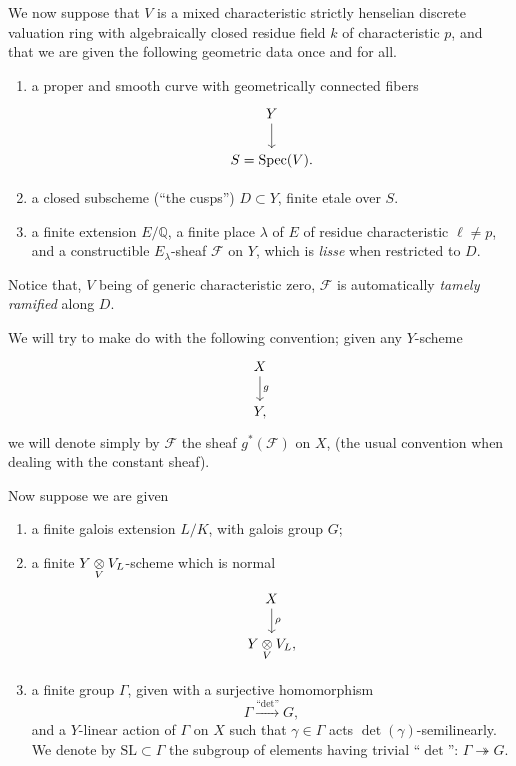 \kmitem\label{item:14.2.1}
We now suppose that $V$ is a mixed characteristic strictly henselian discrete valuation ring with algebraically closed residue field $k$ of characteristic $p$, and that we are given the following geometric data once and for all.
\begin{enumerate}[label=\arabic*)]
\item a proper and smooth curve with geometrically connected fibers
\[
\begin{tikzcd}[row sep=1.8em]
Y \arrow[d] \\
S = \Spec(V) .
\end{tikzcd}
\]
\item a closed subscheme (``the cusps'') $D \subset Y$, finite etale over $S$.
\item a finite extension $E/\mathbb{Q}$, a finite place $\lambda$ of $E$ of residue characteristic $\ell \neq p$, and a constructible $E_\lambda$-sheaf $\mathcal{F}$ on $Y$, which is \emph{lisse} when restricted to $D$.
\end{enumerate}
Notice that, $V$ being of generic characteristic zero, $\mathcal{F}$ is automatically \emph{tamely ramified} along $D$.

\kmitem\label{item:14.2.2}
We will try to make do with the following convention; given any $Y$-scheme
\[
\begin{tikzcd}[row sep=1.8em]
X \arrow[d, "g"] \\
Y ,
\end{tikzcd}
\]
we will denote simply by $\mathcal{F}$ the sheaf $g^*(\mathcal{F})$ on $X$, (the usual convention when dealing with the constant sheaf).

\kmitem\label{item:14.2.3}
Now suppose we are given
\begin{enumerate}[label=\arabic*), start=4]
\item a finite galois extension $L/K$, with galois group $G$;
\item a finite $Y \underset{V}{\otimes} V_L$-scheme which is normal
\[
\begin{tikzcd}[row sep=1.8em]
X \arrow[d, "\rho"] \\
Y \tens{V} V_L ,
\end{tikzcd}
\]
\item a finite group $\Gamma$, given with a surjective homomorphism
\[
\Gamma \xrightarrow{\text{``}\det\text{''}} G ,
\]
and a $Y$-linear action of $\Gamma$ on $X$ such that $\gamma \in \Gamma$ acts $\det(\gamma)$-semilinearly. We denote by $\mathrm{SL} \subset \Gamma$ the subgroup of elements having trivial ``$\det$'': $\Gamma \twoheadrightarrow G$.
\end{enumerate}

